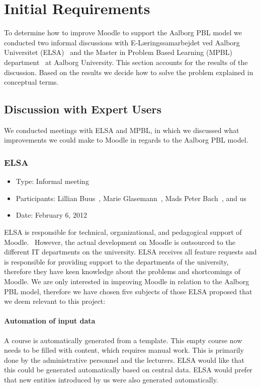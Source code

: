 \chapter{Initial Requirements}
\label{sec:initialAnalysis}
To determine how to improve Moodle to support the Aalborg PBL model we conducted two informal discussions with E-L\ae{}ringssamarbejdet ved Aalborg Universitet (ELSA)~\cite{elsa} and the Master in Problem Based Learning (MPBL) department~\cite{mpbl} at Aalborg University.
This section accounts for the results of the discussion.
Based on the results we decide how to solve the problem explained in conceptual terms.

\section{Discussion with Expert Users}  
\label{sub:expertUsers} 
We conducted meetings with ELSA and MPBL, in which we discussed what improvements we could make to Moodle in regards to the Aalborg PBL model.

\subsection{ELSA}
\label{sub:elsaInterview}
\begin{itemize}
	\item Type: Informal meeting
	\item Participants: Lillian Buus~\cite{lillian}, Marie Glasemann~\cite{marie}, Mads Peter Bach~\cite{mads}, and us 
	\item Date: February 6, 2012
\end{itemize}
ELSA is responsible for technical, organizational, and pedagogical support of Moodle.~\cite{elsa} 
However, the actual development on Moodle is outsourced to the different IT departments on the university. 
ELSA receives all feature requests and is responsible for providing support to the departments of the university, therefore they have keen knowledge about the problems and shortcomings of Moodle. 
We are only interested in improving Moodle in relation to the Aalborg PBL model, therefore we have chosen five subjects of those ELSA proposed that we deem relevant to this project:

\subsubsection{Automation of input data}
A course is automatically generated from a template. 
This empty course now needs to be filled with content, which requires manual work. 
This is primarily done by the administrative personnel and the lecturers. 
ELSA would like that this could be generated automatically based on central data. 
ELSA would prefer that new entities introduced by us were also generated automatically.

